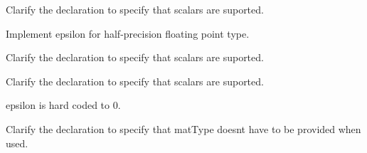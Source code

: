 
\begin{DoxyRefList}
\item[\label{todo__todo000001}%
\Hypertarget{todo__todo000001}%
Member \hyperlink{group__core__func__integer_gaf5ecf64cbcb7f806a3c7915dd622209b}{glm\+:\+:bit\+Count} (gen\+I\+U\+Type$<$ T $>$ const \&Value)]Clarify the declaration to specify that scalars are suported.  
\item[\label{todo__todo000005}%
\Hypertarget{todo__todo000005}%
Member \hyperlink{namespaceglm_1_1detail_a93e21a07df0aa5e5a090fcb3ca513b91}{glm\+:\+:detail\+:\+:sse\+\_\+sqrt\+\_\+wip\+\_\+ss} (\+\_\+\+\_\+m128 const \&x)]




\item[\label{todo__todo000007}%
\Hypertarget{todo__todo000007}%
Member \hyperlink{group__gtc__constants_gacb41049b8d22c8aa90e362b96c524feb}{glm\+:\+:epsilon} ()]Implement epsilon for half-\/precision floating point type.  
\item[\label{todo__todo000002}%
\Hypertarget{todo__todo000002}%
Member \hyperlink{group__core__func__integer_ga43d5d9ec05ba4c46035c764ad5fd3135}{glm\+:\+:find\+L\+SB} (gen\+I\+U\+Type$<$ T $>$ const \&Value)]Clarify the declaration to specify that scalars are suported.  
\item[\label{todo__todo000003}%
\Hypertarget{todo__todo000003}%
Member \hyperlink{group__core__func__integer_gaee931af2eaecf61b629b33899c9d6f29}{glm\+:\+:find\+M\+SB} (gen\+I\+U\+Type$<$ T $>$ const \&Value)]Clarify the declaration to specify that scalars are suported.  
\item[\label{todo__todo000008}%
\Hypertarget{todo__todo000008}%
Member \hyperlink{group__gtx__vector__angle_ga6f9cbae1b02b49ad92a1d0070649f038}{glm\+:\+:oriented\+Angle} (detail\+::tvec2$<$ T, P $>$ const \&x, detail\+::tvec2$<$ T, P $>$ const \&y)]epsilon is hard coded to 0.  
\item[\label{todo__todo000004}%
\Hypertarget{todo__todo000004}%
Member \hyperlink{group__core__func__matrix_gae9f513dc8e4f3ceb993669321b6d0f09}{glm\+:\+:outer\+Product} (vec\+Type\+A$<$ T, P $>$ const \&c, vec\+Type\+B$<$ T, P $>$ const \&r)]Clarify the declaration to specify that mat\+Type doesn\textquotesingle{}t have to be provided when used. 
\end{DoxyRefList}